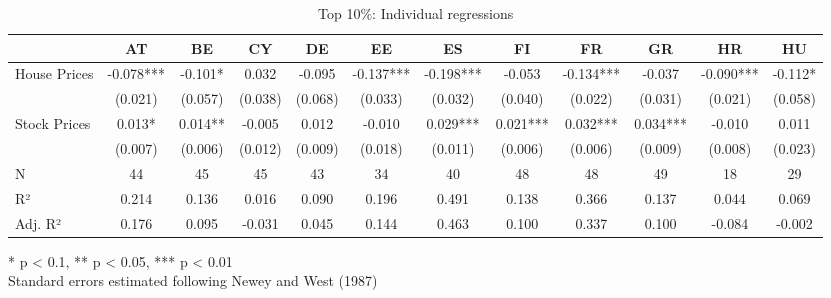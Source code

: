 \begin{table}[h]
\caption{Top 10\%: Individual regressions} 
\fontsize{7.5pt}{9.0pt}\selectfont
\begin{tabular*}{\linewidth}{@{\extracolsep{\fill}}lccccccccccc}
\toprule
  & AT & BE & CY & DE & EE & ES & FI & FR & GR & HR & HU \\ 
\midrule\addlinespace[2.5pt]
House Prices & -0.078*** & -0.101* & 0.032 & -0.095 & -0.137*** & -0.198*** & -0.053 & -0.134*** & -0.037 & -0.090*** & -0.112* \\ 
 & (0.021) & (0.057) & (0.038) & (0.068) & (0.033) & (0.032) & (0.040) & (0.022) & (0.031) & (0.021) & (0.058) \\ 
Stock Prices & 0.013* & 0.014** & -0.005 & 0.012 & -0.010 & 0.029*** & 0.021*** & 0.032*** & 0.034*** & -0.010 & 0.011 \\ 
{} & {(0.007)} & {(0.006)} & {(0.012)} & {(0.009)} & {(0.018)} & {(0.011)} & {(0.006)} & {(0.006)} & {(0.009)} & {(0.008)} & {(0.023)} \\ 
N & 44 & 45 & 45 & 43 & 34 & 40 & 48 & 48 & 49 & 18 & 29 \\ 
R² & 0.214 & 0.136 & 0.016 & 0.090 & 0.196 & 0.491 & 0.138 & 0.366 & 0.137 & 0.044 & 0.069 \\ 
Adj. R² & 0.176 & 0.095 & -0.031 & 0.045 & 0.144 & 0.463 & 0.100 & 0.337 & 0.100 & -0.084 & -0.002 \\ 
\bottomrule
\end{tabular*}
\begin{minipage}{\linewidth}
* p < 0.1, ** p < 0.05, *** p < 0.01\\
Standard errors estimated following Newey and West (1987)\\
\end{minipage}
\end{table}

